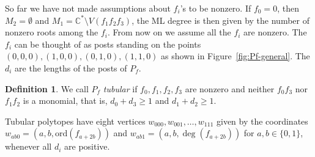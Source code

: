 \documentclass[12pt,reqno]{amsart}   	%
\theoremstyle{plain}
\theoremstyle{definition}
\newtheorem{definition}[theorem]{Definition}
\theoremstyle{remark}
\newcommand{\C}{\mathbb{C}}
\newcommand{\ord}{\mathrm{ord}}
\begin{document}
So far we have not made assumptions about  $f_i$'s to be nonzero. If $f_0=0$, then $M_2=\emptyset $ and $M_1 = \C^\ast \setminus V(f_1f_2f_3)$, the 
ML degree is then given by the number of nonzero roots among the $f_i$.  From now on we assume all the $f_i$ are nonzero. The $f_i$
can be thought of as posts standing on the points $(0,0,0),(1,0,0),(0,1,0),(1,1,0)$  as shown in Figure~\ref{fig:Pf-general}. The $d_i$ are the lengths
of the posts of $P_f$. 
\begin{definition}\label{def:tubular}
We call $P_f$ \textit{tubular} if $f_0,f_1,f_2,f_3$ are nonzero and neither $f_0f_3$ nor $f_1f_2$ is a monomial, that is, $d_0+d_3\geq 1$ and $d_1+d_2\geq 1$.
\end{definition}
Tubular polytopes have eight vertices $w_{000},w_{001},\dots,w_{111}$ given by the coordinates $w_{ab0}= (a,b,\ord (f_{a+2b}))$ and $w_{ab1}=(a,b,\deg (f_{a+2b}))$ for $a,b \in \{0,1\}$, whenever all $d_i$ are positive. 
\end{document}
